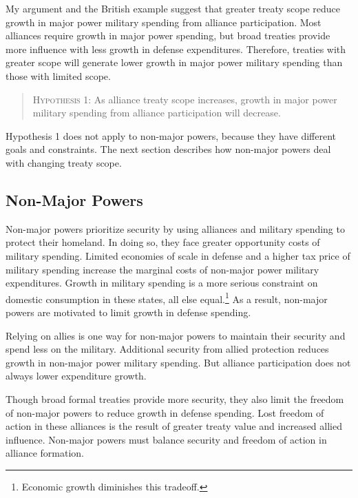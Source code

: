 \documentclass[12pt]{article}
\begin{document}
My argument and the British example suggest that greater treaty scope reduce growth in major power military spending from alliance participation.
Most alliances require growth in major power spending, but broad treaties provide more influence with less growth in defense expenditures. 
Therefore, treaties with greater scope will generate lower growth in major power military spending than those with limited scope. 


\begin{quote}
\textsc{Hypothesis 1}: As alliance treaty scope increases, growth in major power military spending from alliance participation will decrease. 
\end{quote}


Hypothesis 1 does not apply to non-major powers, because they have different goals and constraints. 
The next section describes how non-major powers deal with changing treaty scope. 


\subsection{Non-Major Powers} 


Non-major powers prioritize security by using alliances and military spending to protect their homeland.  
In doing so, they face greater opportunity costs of military spending. 
Limited economies of scale in defense and a higher tax price of military spending increase the marginal costs of non-major power military expenditures. 
Growth in military spending is a more serious constraint on domestic consumption in these states, all else equal.\footnote{Economic growth diminishes this tradeoff.} 
As a result, non-major powers are motivated to limit growth in defense spending.


Relying on allies is one way for non-major powers to maintain their security and spend less on the military.  
Additional security from allied protection reduces growth in non-major power military spending. 
But alliance participation does not always lower expenditure growth.


Though broad formal treaties provide more security, they also limit the freedom of non-major powers to reduce growth in defense spending.
Lost freedom of action in these alliances is the result of greater treaty value and increased allied influence. 
Non-major powers must balance security and freedom of action in alliance formation. 
\end{document}

